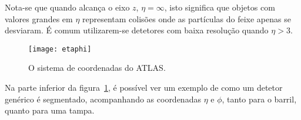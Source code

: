 Nota-se que quando alcança o eixo $z$, $\eta = \infty$, isto significa que
objetos com valores grandes em $\eta$ representam colisões onde as partículas
do feixe apenas se desviaram. É comum utilizarem-se detetores com baixa
resolução quando $\eta > 3$.

\begin{figure}
\begin{center}
\texttt{[image: etaphi]}
\end{center}
\caption{O sistema de coordenadas do ATLAS.}
\label{fig:etaphi}
\end{figure}

Na parte inferior da figura~\ref{fig:etaphi}, é possível ver um exemplo de
como um detetor genérico é segmentado, acompanhando as coordenadas $\eta$ e
$\phi$, tanto para o barril, quanto para uma tampa.

